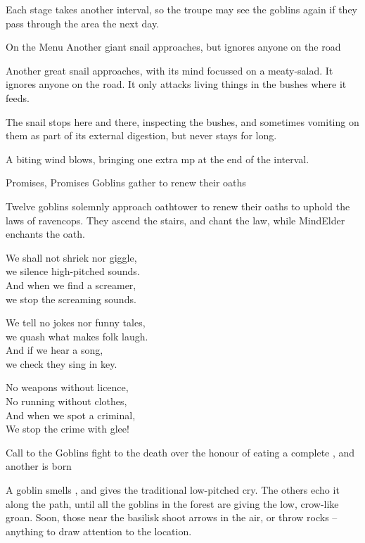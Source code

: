 Each stage takes another \gls{interval}, so the troupe may see the goblins again if they pass through the area the next day.

{On the Menu}%
{Another giant snail approaches, but ignores anyone on the road}%

Another great snail approaches, with its mind focussed on a meaty-salad.
It ignores anyone on the road.
It only attacks living things in the bushes where it feeds.

The snail stops here and there, inspecting the bushes, and sometimes vomiting on them as part of its external digestion, but never stays for long.

A biting wind blows, bringing one extra \gls{mp} at the end of the \gls{interval}.

{Promises, Promises}%
{Goblins gather to renew their oaths}%

Twelve goblins solemnly approach \gls{oathtower} to renew their oaths to uphold the laws of \gls{ravencops}.
They ascend the stairs, and chant the law, while \gls{MindElder} enchants the oath.

\label{ravencopsLaws}
\begin{speechtext}
  We shall not shriek nor giggle, \\
  we silence high-pitched sounds. \\
  And when we find a screamer, \\
  we stop the screaming sounds.

  We tell no jokes nor funny tales, \\
  we quash what makes folk laugh. \\
  And if we hear a song, \\
  we check they sing in key.

  No weapons without licence, \\
  No running without clothes, \\
  And when we spot a criminal, \\
  We stop the crime with glee!
\end{speechtext}

{Call to the }%
{Goblins fight to the death over the honour of eating a complete , and another  is born}%

A goblin smells , and gives the traditional low-pitched cry.
The others echo it along the path, until all the goblins in the forest are giving the low, crow-like groan.
Soon, those near the \gls{basilisk} shoot arrows in the air, or throw rocks -- anything to draw attention to the location.


